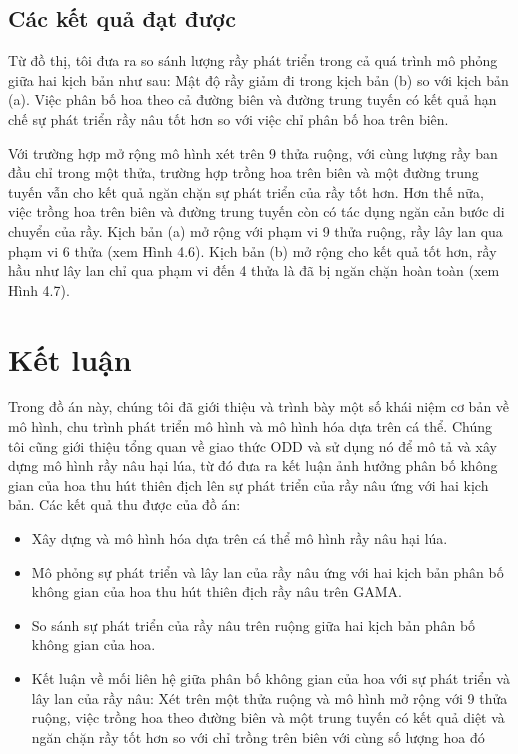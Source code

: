 \documentclass[13pt]{extreport}
\begin{document}
{\section{Các kết quả đạt được}
Từ đồ thị, tôi đưa ra so sánh lượng rầy phát triển trong cả quá trình mô phỏng giữa hai kịch bản như sau: Mật độ rầy giảm đi trong kịch bản (b) so với kịch bản (a). Việc phân bố hoa theo cả đường biên và đường trung tuyến có kết quả hạn chế sự phát triển rầy nâu tốt hơn so với việc chỉ phân bố hoa trên biên.

Với trường hợp mở rộng mô hình xét trên 9 thửa ruộng, với cùng lượng rầy ban đầu chỉ trong một thửa, trường hợp trồng hoa trên biên và một đường trung tuyến vẫn cho kết quả ngăn chặn sự phát triển của rầy tốt hơn. Hơn thế nữa, việc trồng hoa trên biên và đường trung tuyến còn có tác dụng ngăn cản bước di chuyển của rầy. Kịch bản (a) mở rộng với phạm vi 9 thửa ruộng, rầy lây lan qua phạm vi 6 thửa (xem Hình 4.6). Kịch bản (b) mở rộng cho kết quả tốt hơn, rầy hầu như lây lan chỉ qua phạm vi đến 4 thửa là đã bị ngăn chặn hoàn toàn (xem Hình 4.7). 
\newpage

\chapter{Kết luận}
Trong đồ án này, chúng tôi đã giới thiệu và trình bày một số khái niệm cơ bản về mô hình, chu trình phát triển mô hình và mô hình hóa dựa trên cá thể. Chúng tôi cũng giới thiệu tổng quan về giao thức ODD và sử dụng nó để mô tả và xây dựng mô hình rầy nâu hại lúa, từ đó đưa ra kết luận ảnh hưởng phân bố không gian của hoa thu hút thiên địch lên sự phát triển của rầy nâu ứng với hai kịch bản. Các kết quả thu được của đồ án:
\begin{itemize}
\item Xây dựng và mô hình hóa dựa trên cá thể mô hình rầy nâu hại lúa.
\item Mô phỏng sự phát triển và lây lan của rầy nâu ứng với hai kịch bản phân bố không gian của hoa thu hút thiên địch rầy nâu trên GAMA.
\item So sánh sự phát triển của rầy nâu trên ruộng giữa hai kịch bản phân bố không gian của hoa.
\item Kết luận về mối liên hệ giữa phân bố không gian của hoa với sự phát triển và lây lan của rầy nâu: Xét trên một thửa ruộng và mô hình mở rộng với 9 thửa ruộng, việc trồng hoa theo đường biên và một trung tuyến có kết quả diệt và ngăn chặn rầy tốt hơn so với chỉ trồng trên biên với cùng số lượng hoa đó
\end{itemize} 

}
\end{document}
